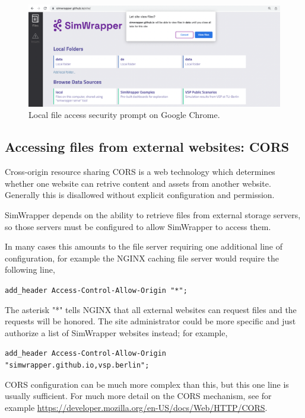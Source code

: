 \begin{figure}[ht]
  \centering
  \includegraphics[width=0.8\linewidth]{chapters/31-simwrapper/images/chrome-access.png}
  \caption{Local file access security prompt on Google Chrome.}
  \label{fig:simwrapper-chrome}
\end{figure}


\hypertarget{simwrapper-cors}{%
\subsection{Accessing files from external websites: CORS}
\label{simwrapper-cors}}

Cross-origin resource sharing \gls{CORS} is a web technology which determines whether one website can retrive content and assets from another website. Generally this is disallowed without explicit configuration and permission.

SimWrapper depends on the ability to retrieve files from external storage servers, so those servers must be configured to allow SimWrapper to access them.

In many cases this amounts to the file server requiring one additional line of configuration, for example the NGINX caching file server would require the following line,

\texttt{add\_header Access-Control-Allow-Origin "*";}

The asterisk "*" tells NGINX that all external websites can request files and the requests will be honored. The site administrator could be more specific and just authorize a list of SimWrapper websites instead; for example,

\texttt{add\_header Access-Control-Allow-Origin "simwrapper.github.io,vsp.berlin";}

CORS configuration can be much more complex than this, but this one line is usually sufficient. For much more detail on the CORS mechanism, see for example \url{https://developer.mozilla.org/en-US/docs/Web/HTTP/CORS}.



